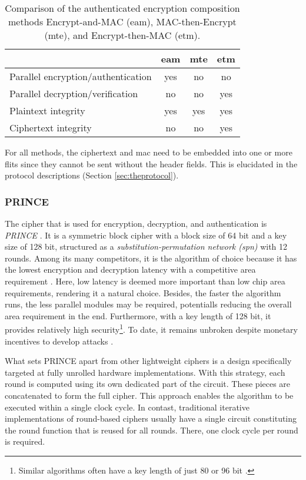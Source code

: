 \begin{table}
    \centering
    \begin{tabulary}{\textwidth}{L|CCC}
        & \gls{eam} & \gls{mte} & \gls{etm} \\\hline
        Parallel encryption/authentication & yes & no & no \\
        Parallel decryption/verification & no & no & yes \\
        Plaintext integrity & yes & yes & yes \\
        Ciphertext integrity & no & no & yes
    \end{tabulary}
    \caption[Comparison of authenticated encryption composition methods]{Comparison of the authenticated encryption composition methods
    Encrypt-and-MAC (\gls{eam}), MAC-then-Encrypt (\gls{mte}), and Encrypt-then-MAC (\gls{etm}).}
    \label{tab:compositionmethods}
\end{table}

For all methods, the ciphertext and \gls{mac} need to be embedded into one or more flits since they cannot be sent without the header fields. This is
elucidated in the protocol descriptions (Section \ref{sec:theprotocol}).

\subsubsection{PRINCE}\label{subsubsec:prince}
The cipher that is used for encryption, decryption, and authentication is \textit{PRINCE} \cite{borghoff12prince}. It is a symmetric block cipher with
a block size of 64 bit and a key size of 128 bit, structured as a \textit{substitution-permutation network (\gls{spn})} with 12 rounds. Among its many
competitors, it is the algorithm of choice because it has the lowest encryption and decryption latency with a competitive area requirement
\cite{harttung17lightweightcrypto}. Here, low latency is deemed more important than low chip area requirements, rendering it a natural choice. Besides, the
faster the algorithm runs, the less parallel modules may be required, potentialls reducing the overall area requirement in the end. Furthermore, with a
key length of 128 bit, it provides relatively high security\footnote{Similar algorithms often have a key length of just 80 or 96 bit
\cite[5]{harttung17lightweightcrypto}.}. To date, it remains unbroken despite monetary incentives to develop attacks \cite{princechallenge}.

What sets PRINCE apart from other lightweight ciphers is a design specifically targeted at fully unrolled hardware implementations. With this
strategy, each round is computed using its own dedicated part of the circuit. These pieces are concatenated to form the full cipher. This approach
enables the algorithm to be executed within a single clock cycle. In contast, traditional iterative implementations of round-based ciphers usually
have a single circuit constituting the round function that is reused for all rounds. There, one clock cycle per round is required.

